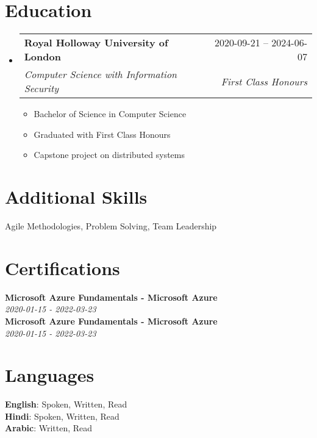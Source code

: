 \documentclass[letterpaper,11pt]{article}
\makeatletter
\newcommand{\resumeItem}[1]{
  \item\small{
    {#1 \vspace{-2pt}}
  }
}
\newcommand{\resumeSubheading}[4]{
  \vspace{-2pt}\item
    \begin{tabular*}{0.97\textwidth}[t]{l@{\extracolsep{\fill}}r}
      \textbf{#1} & #2 \\
      \textit{\small#3} & \textit{\small #4} \\
    \end{tabular*}\vspace{-7pt}
}
\newcommand{\resumeSubHeadingListStart}{\begin{itemize}[leftmargin=0.15in, label={}]}
\newcommand{\resumeSubHeadingListEnd}{\end{itemize}}
\newcommand{\resumeItemListStart}{\begin{itemize}}
\newcommand{\resumeItemListEnd}{\end{itemize}\vspace{-5pt}}
\makeatother
\begin{document}
    \section{Education}
      \resumeSubHeadingListStart
            \resumeSubheading
            {Royal Holloway University of London}{2020-09-21 -- 2024-06-07}
            {Computer Science with Information Security}{First Class Honours}
            \resumeItemListStart
                \resumeItem{Bachelor of Science in Computer Science}
                \resumeItem{Graduated with First Class Honours}
                \resumeItem{Capstone project on distributed systems}
            \resumeItemListEnd
      \resumeSubHeadingListEnd


    \section*{Additional Skills}
            Agile Methodologies, 
            Problem Solving, 
            Team Leadership

    \section{Certifications}
      \begin{itemize}[leftmargin=0.15in, label={}]
        \small{\item{
         \textbf{Microsoft Azure Fundamentals - Microsoft Azure} \\
         \textit{2020-01-15 - 2022-03-23} \\
         \textbf{Microsoft Azure Fundamentals - Microsoft Azure} \\
         \textit{2020-01-15 - 2022-03-23} \\
        }}
     \end{itemize}

    \section{Languages}
        \begin{itemize}[leftmargin=0.15in, label={}]
            \small{\item{
                    \textbf{English}{: Spoken, Written, Read} \\
                    \textbf{Hindi}{: Spoken, Written, Read} \\
                    \textbf{Arabic}{: Written, Read} 
            }}
        \end{itemize}

\end{document}
